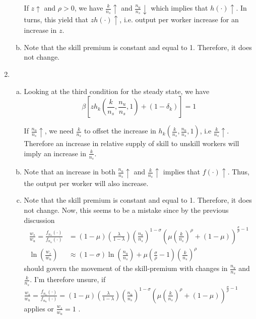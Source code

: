 \documentclass[12pt]{article}
\newcommand{\1}{{\bf 1}} %
\begin{document}
\begin{enumerate}[(1)]
\begin{enumerate}[(a)]
		If $z \uparrow$ and $\rho>0$, we have $ \frac{k}{n_s} \uparrow$ and $\frac{n_u}{n_s} \downarrow$ which implies that $h\left(\cdot \right) \uparrow$. In turns, this yield that $zh(\cdot) \uparrow$, i.e. output per worker increase for an increase in $z$.
		\item
		
		Note that the skill premium is constant and equal to 1. Therefore, it does not change.
	\end{enumerate}

	\item 
	\begin{enumerate}[(a)]
		\item 
		
				Looking at the third condition for the steady state, we have
		\[
		\beta \left[  zh_k\left( \frac{k}{n_s},\frac{n_u}{n_s},1\right) +(1-\delta_k)\right]  =1
		\]
		
		If  $\frac{n_u}{n_s} \uparrow$, we need $\frac{k}{n_s}$ to offset the increase in $h_k\left( \frac{k}{n_s},\frac{n_u}{n_s},1\right)$, i.e $\frac{k}{n_s} \uparrow$. Therefore an increase in relative supply of skill to unskill workers will imply an increase in $\frac{k}{n_s}$.
		
		\item 
		
		Note that an increase in both $\frac{n_u}{n_s} \uparrow$ and $\frac{k}{n_s} \uparrow$ implies that $f(\cdot)\uparrow$. Thus, the output per worker will also increase.
	
		\item 
		
	Note that the skill premium is constant and equal to 1. Therefore, it does not change. Now, this seems to be a mistake since by the previous discussion
					\begin{equation*}
	\begin{aligned}
	\frac{w_s}{w_u}=\frac{f_{n_s}(\cdot)}{f_{n_u}(\cdot)} &= (1-\mu)\left( \frac{\lambda}{1-\lambda}\right)  \left( \frac{n_u}{n_s}\right)^{1-\sigma}  \left( \mu\left( \frac{k}{n_s}\right)^{\rho}+(1-\mu)\right) ^{\frac{\sigma}{\rho}-1}\\
	\ln\left( \frac{w_s}{w_u} \right) & \approx (1-\sigma) \ln \left( \frac{n_u}{n_s}\right) + \mu \left( \frac{\sigma}{\rho}-1\right)  \left( \frac{k}{n_s}\right) ^{\rho}
	\end{aligned}
	\end{equation*}
	should govern the movement of the skill-premium with changes in  $\frac{n_u}{n_s} $ and $\frac{k}{n_s}$.  I'm therefore unsure, if  $\frac{w_s}{w_u}=\frac{f_{n_s}(\cdot)}{f_{n_u}(\cdot)} = (1-\mu)\left( \frac{\lambda}{1-\lambda}\right)  \left( \frac{n_u}{n_s}\right)^{1-\sigma}  \left( \mu\left( \frac{k}{n_s}\right)^{\rho}+(1-\mu)\right) ^{\frac{\sigma}{\rho}-1}$ applies or $\frac{w_s}{w_u}=1$ .
	\end{enumerate}


\end{enumerate}
\end{document}
